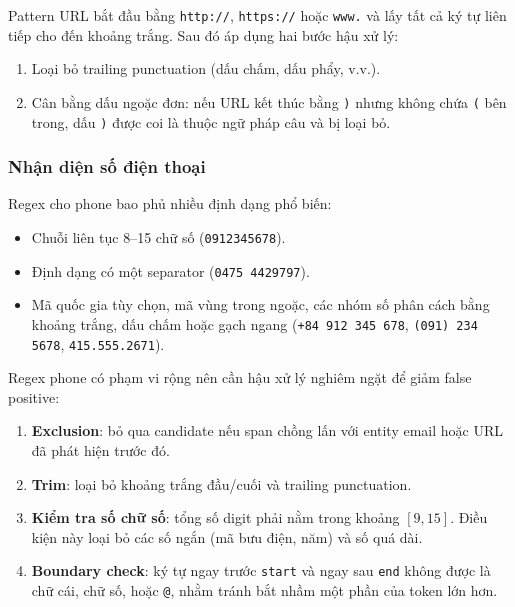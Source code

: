Pattern URL bắt đầu bằng \texttt{http://}, \texttt{https://} hoặc \texttt{www.}
và lấy tất cả ký tự liên tiếp cho đến khoảng trắng. Sau đó áp dụng hai bước
hậu xử lý:

\begin{enumerate}[nosep]
    \item Loại bỏ trailing punctuation (dấu chấm, dấu phẩy, v.v.).
    \item Cân bằng dấu ngoặc đơn: nếu URL kết thúc bằng \texttt{)} nhưng
          không chứa \texttt{(} bên trong, dấu \texttt{)} được coi là thuộc
          ngữ pháp câu và bị loại bỏ.
\end{enumerate}

\subsubsection{Nhận diện số điện thoại}

Regex cho phone bao phủ nhiều định dạng phổ biến:

\begin{itemize}[nosep]
    \item Chuỗi liên tục 8--15 chữ số (\texttt{0912345678}).
    \item Định dạng có một separator (\texttt{0475 4429797}).
    \item Mã quốc gia tùy chọn, mã vùng trong ngoặc, các nhóm số phân cách
          bằng khoảng trắng, dấu chấm hoặc gạch ngang
          (\texttt{+84 912 345 678}, \texttt{(091) 234 5678},
          \texttt{415.555.2671}).
\end{itemize}

Regex phone có phạm vi rộng nên cần hậu xử lý nghiêm ngặt để giảm false
positive:

\begin{enumerate}[nosep]
    \item \textbf{Exclusion}: bỏ qua candidate nếu span chồng lấn với entity
          email hoặc URL đã phát hiện trước đó.
    \item \textbf{Trim}: loại bỏ khoảng trắng đầu/cuối và trailing punctuation.
    \item \textbf{Kiểm tra số chữ số}: tổng số digit phải nằm trong khoảng
          $[9, 15]$. Điều kiện này loại bỏ các số ngắn (mã bưu điện, năm)
          và số quá dài.
    \item \textbf{Boundary check}: ký tự ngay trước \texttt{start} và ngay sau
          \texttt{end} không được là chữ cái, chữ số, hoặc \texttt{@}, nhằm
          tránh bắt nhầm một phần của token lớn hơn.
\end{enumerate}

